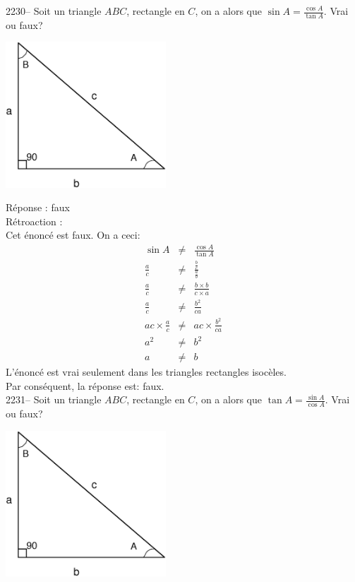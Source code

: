 \documentclass[letterpaper, 12pt]{article}
\begin{document}
2230-- Soit un triangle $ABC$, rectangle en $C$, on a alors que $\sin{A}=\frac{\cos{A}}{\tan{A}}$. Vrai ou faux? \\
\begin{center}
 \includegraphics[width=6cm,bb=14 14 580 527]{Triangle_rectangle2.eps}
\end{center}

R\'eponse : faux\\

R\'etroaction :\\
Cet \'enonc\'e est faux. On a ceci:
\begin{eqnarray*}
\sin{A}&\neq&\frac{\cos{A}}{\tan{A}}\\[2mm]
\frac{a}{c}&\neq&\frac{\frac{b}{c}}{\frac{a}{b}}\\[2mm]
\frac{a}{c}&\neq&\frac{b\times b}{c\times a}\\[2mm]
\frac{a}{c}&\neq&\frac{b^{2}}{ca}\\[2mm]
ac\times \frac{a}{c}&\neq&ac\times \frac{b^{2}}{ca}\\[2mm]
a^{2}&\neq&b^{2}\\[2mm]
a&\neq&b
\end{eqnarray*}
L'\'enonc\'e est vrai seulement dans les triangles rectangles isoc\`eles.\\
Par cons\'equent, la r\'eponse est: faux.\\

2231-- Soit un triangle $ABC$, rectangle en $C$, on a alors que $\tan{A}=\frac{\sin{A}}{\cos{A}}$. Vrai ou faux? \\
\begin{center}
 \includegraphics[width=6cm,bb=14 14 580 527]{Triangle_rectangle2.eps}
\end{center}
\end{document}
